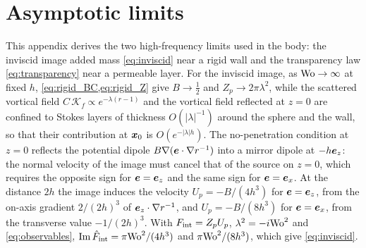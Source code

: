 \section{Asymptotic limits}\label{app:asymptotics}
This appendix derives the two high-frequency limits used in the body: the inviscid image added mass
\cref{eq:inviscid} near a rigid wall and the transparency law \cref{eq:transparency} near a permeable layer. For the inviscid image, as $\mathrm{Wo}\to\infty$ at fixed $h$, \cref{eq:rigid_BC,eq:rigid_Z} give $B\to\tfrac12$ and
$Z_p\to2\pi\lambda^2$, while the scattered vortical field $C\,\mathcal K_f\propto e^{-\lambda(r-1)}$ and the vortical
field reflected at $z=0$ are confined to Stokes layers of thickness $O(|\lambda|^{-1})$ around the sphere and the wall,
so that their contribution at $\bm{x}_0$ is $O(e^{-|\lambda|h})$. The no-penetration condition at $z=0$ reflects the
potential dipole $B\nabla(\bm{e}\cdot\nabla r^{-1})$ into a mirror dipole at $-h\bm{e}_z$: the normal velocity of the image
must cancel that of the source on $z=0$, which requires the opposite sign for $\bm{e}=\bm{e}_z$ and the same sign for
$\bm{e}=\bm{e}_x$. At the distance $2h$ the image induces the velocity $U_p=-B/(4h^3)$ for $\bm{e}=\bm{e}_z$, from the on-axis
gradient $2/(2h)^3$ of $\bm{e}_z\cdot\nabla r^{-1}$, and $U_p=-B/(8h^3)$ for $\bm{e}=\bm{e}_x$, from the transverse value
$-1/(2h)^3$. With $F_{\rm int}=Z_pU_p$, $\lambda^2=-i\mathrm{Wo}^2$ and \cref{eq:observables}, $\operatorname{Im}\hat F_{\rm
int}=\pi\mathrm{Wo}^2/(4h^3)$ and $\pi\mathrm{Wo}^2/(8h^3)$, which give \cref{eq:inviscid}.

